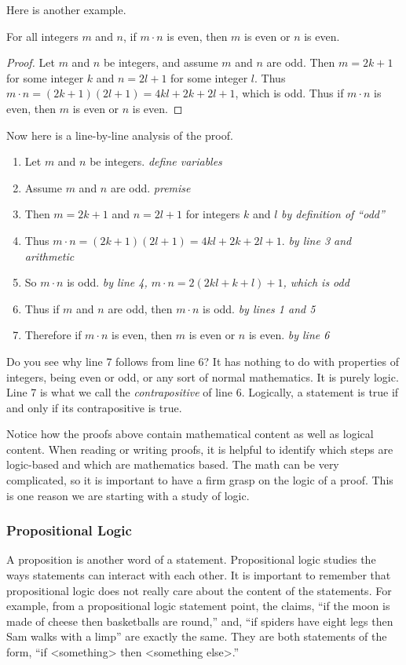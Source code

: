 Here is another example.

\begin{theorem}
 For all integers $m$ and $n$, if $m\cdot n$ is even, then $m$ is even or $n$ is even.
\end{theorem}

\begin{proof}
 Let $m$ and $n$ be integers, and assume $m$ and $n$ are odd.  Then $m = 2k +1$ for some integer $k$ and $n = 2l+1$ for some integer $l$.  Thus $m \cdot n = (2k+1)(2l+1) = 4kl+2k + 2l + 1$, which is odd.  Thus if $m \cdot n$ is even, then $m$ is even or $n$ is even.
\end{proof}

Now here is a line-by-line analysis of the proof.  

\begin{enumerate}
 \item Let $m$ and $n$ be integers. \hfill{\em define variables}
\item Assume $m$ and $n$ are odd. \hfill{\em premise}
\item Then $m = 2k+1$ and $n = 2l+1$ for integers $k$ and $l$ \hfill{\em by definition of ``odd''}
\item Thus $m \cdot n = (2k+1)(2l+1) = 4kl+2k + 2l + 1$. \hfill{\em by line 3 and arithmetic}
\item So $m\cdot n$ is odd. \hfill{\em by line 4, $m \cdot n = 2(2kl + k + l) + 1$, which is odd}
\item Thus if $m$ and $n$ are odd, then $m\cdot n$ is odd. \hfill{\em by lines 1 and 5}
\item Therefore if $m\cdot n$ is even, then $m$ is even or $n$ is even. \hfill{\em by line 6}
\end{enumerate}

Do you see why line 7 follows from line 6?  It has nothing to do with properties of integers, being even or odd, or any sort of normal mathematics.  It is purely logic.  Line 7 is what we call the {\em contrapositive} of line 6.  Logically, a statement is true if and only if its contrapositive is true. 

Notice how the proofs above contain mathematical content as well as logical content.  When reading or writing proofs, it is helpful to identify which steps are logic-based and which are mathematics based.  The math can be very complicated, so it is important to have a firm grasp on the logic of a proof.  This is one reason we are starting with a study of logic.


\subsubsection*{Propositional Logic}
A proposition is another word of a statement.  Propositional logic studies the ways statements can interact with each other.  It is important to remember that propositional logic does not really care about the content of the statements.  For example, from a propositional logic statement point, the claims, ``if the moon is made of cheese then basketballs are round,'' and, ``if spiders have eight legs then Sam walks with a limp'' are exactly the same.  They are both statements of the form, ``if <something> then <something else>.''

